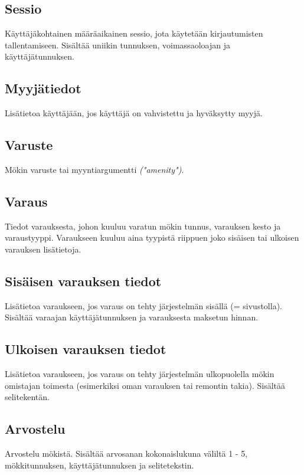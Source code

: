 \subsection{Sessio}
Käyttäjäkohtainen määräaikainen sessio, jota käytetään kirjautumisten tallentamiseen. Sisältää uniikin tunnuksen, voimassaoloajan ja käyttäjätunnuksen.

\subsection{Myyjätiedot}
Lisätietoa käyttäjään, jos käyttäjä on vahvistettu ja hyväksytty myyjä.

\subsection{Varuste}
Mökin varuste tai myyntiargumentti \textit{("amenity")}.

\subsection{Varaus}
Tiedot varauksesta, johon kuuluu varatun mökin tunnus, varauksen kesto ja varaustyyppi. Varaukseen kuuluu aina tyypistä riippuen joko sisäisen tai ulkoisen varauksen lisätietoja.

\subsection{Sisäisen varauksen tiedot}
Lisätietoa varaukseen, jos varaus on tehty järjestelmän sisällä (= sivustolla). Sisältää varaajan käyttäjätunnuksen ja varauksesta maksetun hinnan.

\subsection{Ulkoisen varauksen tiedot}
Lisätietoa varaukseen, jos varaus on tehty järjestelmän ulkopuolella mökin omistajan toimesta (esimerkiksi oman varauksen tai remontin takia). Sisältää selitekentän.

\subsection{Arvostelu}
Arvostelu mökistä. Sisältää arvosanan kokonaislukuna väliltä 1 - 5, mökkitunnuksen, käyttäjätunnuksen ja selitetekstin.